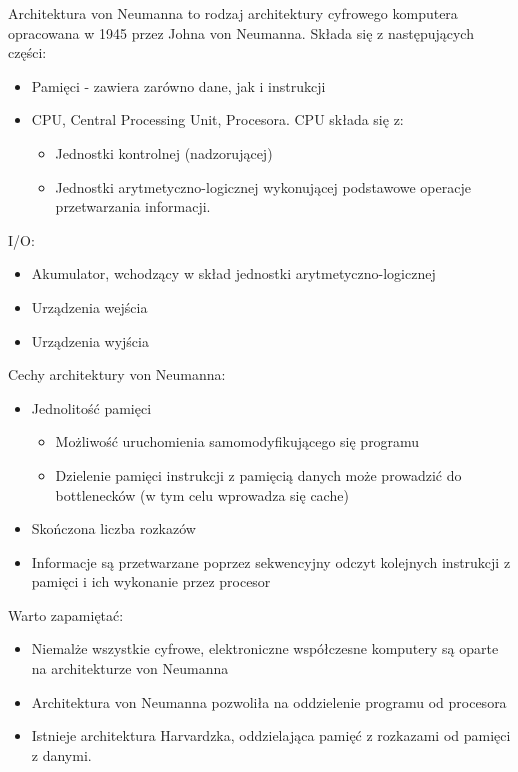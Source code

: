 \documentclass[main.tex]{subfiles}
\begin{document}
    Architektura von Neumanna to rodzaj architektury cyfrowego komputera opracowana w 1945 przez Johna von Neumanna.
    Składa się z następujących części:

    \begin{itemize}
        \item Pamięci - zawiera zarówno dane, jak i instrukcji
        \item CPU, Central Processing Unit, Procesora. CPU składa się z:
        \begin{itemize}
            \item Jednostki kontrolnej (nadzorującej)
            \item Jednostki arytmetyczno-logicznej wykonującej podstawowe operacje przetwarzania informacji.
        \end{itemize}
    \end{itemize}

    I/O:
    \begin{itemize}
        \item Akumulator, wchodzący w skład jednostki arytmetyczno-logicznej
        \item Urządzenia wejścia
        \item Urządzenia wyjścia
    \end{itemize}

    Cechy architektury von Neumanna:
    \begin{itemize}
        \item Jednolitość pamięci
        \begin{itemize}
            \item Możliwość uruchomienia samomodyfikującego się programu
            \item Dzielenie pamięci instrukcji z pamięcią danych może prowadzić do bottlenecków (w tym celu wprowadza się cache)
        \end{itemize}
        \item Skończona liczba rozkazów
        \item Informacje są przetwarzane poprzez sekwencyjny odczyt kolejnych instrukcji z pamięci i ich wykonanie przez procesor
    \end{itemize}

    Warto zapamiętać:
    \begin{itemize}
        \item Niemalże wszystkie cyfrowe, elektroniczne współczesne komputery są oparte na architekturze von Neumanna
        \item Architektura von Neumanna pozwoliła na oddzielenie programu od procesora
        \item Istnieje architektura Harvardzka, oddzielająca pamięć z rozkazami od pamięci z danymi.
    \end{itemize}
\end{document}
